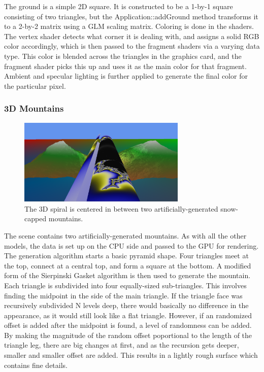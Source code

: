 \documentclass[journal]{IEEEtran}
\begin{document}
The ground is a simple 2D square. It is constructed to be a 1-by-1 square consisting of two triangles, but the Application::addGround method transforms it to a 2-by-2 matrix using a GLM scaling matrix. Coloring is done in the shaders. The vertex shader detects what corner it is dealing with, and assigns a solid RGB color accordingly, which is then passed to the fragment shaders via a varying data type. This color is blended across the triangles in the graphics card, and the fragment shader picks this up and uses it as the main color for that fragment. Ambient and specular lighting is further applied to generate the final color for the particular pixel.

\subsubsection{3D Mountains}

\begin{figure}[htbp]
\centering
\fbox
{
	\begin{minipage}{8 cm}
		\includegraphics[width=80mm]{resources/screenshot2.png}
		\caption{The 3D spiral is centered in between two artificially-generated snow-capped mountains.}
	\end{minipage}
}
\end{figure}

The scene contains two artificially-generated mountains. As with all the other models, the data is set up on the CPU side and passed to the GPU for rendering. The generation algorithm starts a basic pyramid shape. Four triangles meet at the top, connect at a central top, and form a square at the bottom. A modified form of the Sierpinski Gasket algorithm is then used to generate the mountain. Each triangle is subdivided into four equally-sized sub-triangles. This involves finding the midpoint in the side of the main triangle. If the triangle face was recursively subdivided N levels deep, there would basically no difference in the appearance, as it would still look like a flat triangle. However, if an randomized offset is added after the midpoint is found, a level of randomness can be added. By making the magnitude of the random offset poportional to the length of the triangle leg, there are big changes at first, and as the recursion gets deeper, smaller and smaller offset are added. This results in a lightly rough surface which contains fine details.
\end{document}
